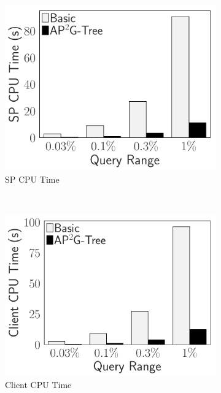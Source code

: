 \begin{figure}[t]
    \centering
    \begin{subfigure}{.33\linewidth}
        \includegraphics[width=\linewidth]{exp-figs/access-control/join_sp.pdf}
        \caption{SP CPU Time}
    \end{subfigure}~%
    \begin{subfigure}{.33\linewidth}
        \includegraphics[width=\linewidth]{exp-figs/access-control/join_user.pdf}
        \caption{Client CPU Time}
    \end{subfigure}~%
    \begin{subfigure}{.33\linewidth}

\end{subfigure}
\end{figure}
